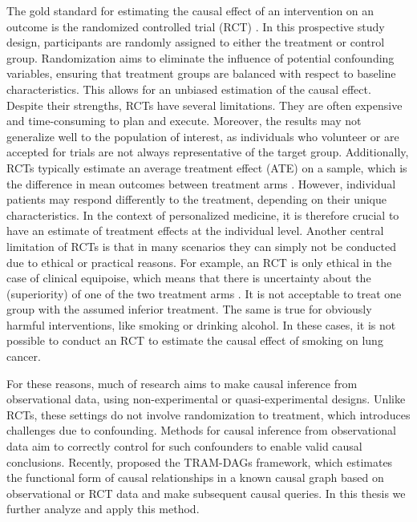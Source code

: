 The gold standard for estimating the causal effect of an intervention on an outcome is the randomized controlled trial (RCT) \citep{hariton2018}. In this prospective study design, participants are randomly assigned to either the treatment or control group. Randomization aims to eliminate the influence of potential confounding variables, ensuring that treatment groups are balanced with respect to baseline characteristics. This allows for an unbiased estimation of the causal effect. Despite their strengths, RCTs have several limitations. They are often expensive and time-consuming to plan and execute. Moreover, the results may not generalize well to the population of interest, as individuals who volunteer or are accepted for trials are not always representative of the target group. Additionally, RCTs typically estimate an average treatment effect (ATE) on a sample, which is the difference in mean outcomes between treatment arms \citep{nichols2007}. However, individual patients may respond differently to the treatment, depending on their unique characteristics. In the context of personalized medicine, it is therefore crucial to have an estimate of treatment effects at the individual level. Another central limitation of RCTs is that in many scenarios they can simply not be conducted due to ethical or practical reasons. For example, an RCT is only ethical in the case of clinical equipoise, which means that there is uncertainty about the (superiority) of one of the two treatment arms \citep{freedman1987}. It is not acceptable to treat one group with the assumed inferior treatment. The same is true for obviously harmful interventions, like smoking or drinking alcohol. In these cases, it is not possible to conduct an RCT to estimate the causal effect of smoking on lung cancer. 

For these reasons, much of research aims to make causal inference from observational data, using non-experimental or quasi-experimental designs. Unlike RCTs, these settings do not involve randomization to treatment, which introduces challenges due to confounding. Methods for causal inference from observational data aim to correctly control for such confounders to enable valid causal conclusions. Recently, \citet{sick2025} proposed the TRAM-DAGs framework, which estimates the functional form of causal relationships in a known causal graph based on observational or RCT data and make subsequent causal queries. In this thesis we further analyze and apply this method.

